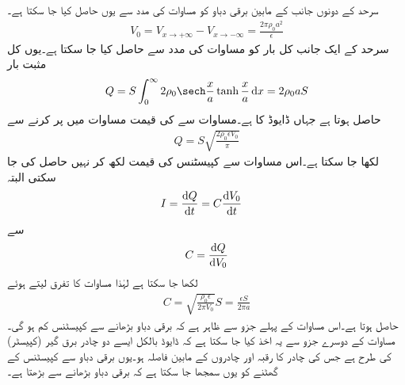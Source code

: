 سرحد کے دونوں جانب کے مابین برقی دباو  کو مساوات  کی مدد سے یوں حاصل کیا جا سکتا ہے۔
\begin{align}\label{مساوات_لاپلاس_ڈایوڈ_اندرونی_دباو}
V_0=V_{x \to +\infty}-V_{x \to -\infty}=\frac{2\pi\rho_0 a^2}{\epsilon}
\end{align}
سرحد کے ایک جانب کل بار کو مساوات  کی مدد سے حاصل کیا جا سکتا ہے۔یوں کل مثبت بار
\begin{align}\label{مساوات_لاپلاس_ڈایوڈ_کل_بار_الف}
Q=S \int_0^{\infty} 2 \rho_0 \sech \frac{x}{a}\tanh \frac{x}{a} \dif x=2\rho_0 a S
\end{align}
حاصل ہوتا ہے جہاں ڈایوڈ کا   ہے۔مساوات  سے  کی قیمت مساوات  میں پر کرنے سے
\begin{align}\label{مساوات_لاپلاس_ڈایوڈ_کل_بار_ب}
Q=S \sqrt{\frac{2\rho_0 \epsilon V_0}{\pi}}
\end{align} 
لکھا جا سکتا ہے۔اس مساوات سے کپیسٹنس کی قیمت  لکھ کر نہیں حاصل کی جا سکتی البتہ
\begin{align*}
I&=\frac{\dif Q}{\dif t} =C \frac{\dif V_0}{\dif t}
\end{align*}
سے
\begin{align*}
C=\frac{\dif Q}{\dif V_0}
\end{align*}
لکھا جا سکتا ہے  لہٰذا مساوات  کا تفرق لیتے ہوئے
\begin{align*}
C=\sqrt{\frac{\rho_0 \epsilon}{2\pi V_0}} S=\frac{\epsilon S}{2\pi a}
\end{align*}
حاصل ہوتا ہے۔اس مساوات  کے پہلے جزو سے ظاہر ہے کہ برقی دباو بڑھانے سے کپیسٹنس کم ہو گی۔مساوات کے دوسرے جزو سے یہ اخذ کیا جا سکتا ہے کہ ڈایوڈ بالکل ایسے  دو چادر برق گیر (کپیسٹر)  کی طرح ہے جس کی چادر کا رقبہ  اور چادروں کے مابین فاصلہ   ہو۔یوں برقی دباو سے کپیسٹنس کے گھٹنے کو یوں سمجھا جا سکتا ہے کہ برقی دباو بڑھانے سے   بڑھتا ہے۔ 


